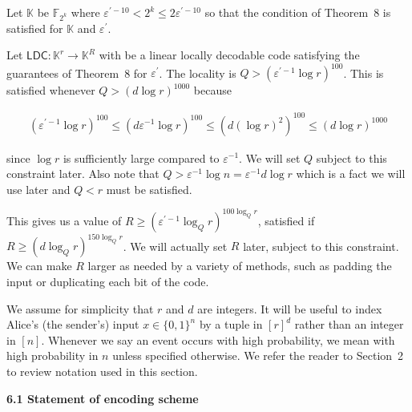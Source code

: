 Let $\mathbb{K}$ be $\mathbb{F}_{2^{k}}$ where $\varepsilon^{\prime-10}<2^{k}\leq 2\varepsilon^{\prime-10}$ so that the condition of Theorem 8 is satisfied for $\mathbb{K}$ and $\varepsilon^{\prime}$.\par




Let $\mathsf{LDC}:\mathbb{K}^{r}\to\mathbb{K}^{R}$ with be a linear locally decodable code satisfying the guarantees of Theorem 8 for $\varepsilon^{\prime}$. The locality is $Q>\left(\varepsilon^{\prime-1}\log r\right)^{100}$. This is satisfied whenever $Q>\left(d\log r\right)^{1000}$ because\par


\[\begin{gathered}
\left(\varepsilon^{\prime-1}\log r\right)^{100}\leq\left(d\varepsilon^{-1}\log
r\right)^{100}\leq\left(d(\log r)^{2}\right)^{100}\leq\left(d\log r\right)^{1000}
\end{gathered}\]


since $\log r$ is sufficiently large compared to $\varepsilon^{-1}$.
We will set $Q$ subject to this constraint later. Also note that $Q>\varepsilon^{-1}\log n=\varepsilon^{-1}d\log r$ which is a fact we will use later and $Q<r$ must be satisfied.\par




This gives us a value of $R\geq(\varepsilon^{\prime-1}\log_{Q}r)^{100\log_{Q}r}$, satisfied if $R\geq(d\log_{Q}r)^{150\log_{Q}r}$. We will actually set $R$ later, subject to this constraint. We can make $R$ larger as needed by a variety of methods, such as padding the input or duplicating each bit of the code.\par




We assume for simplicity that $r$ and $d$ are integers. It will be useful to index Alice’s (the sender’s) input $x\in\{0,1\}^{n}$ by a tuple in $[r]^{d}$ rather than an integer in $[n]$. Whenever we say an event occurs with high probability, we mean with high probability in $n$ unless specified otherwise. We refer the reader to Section 2 to review notation used in this section.\par






\par\medskip\noindent\textbf{
6.1 Statement of encoding scheme}\par




